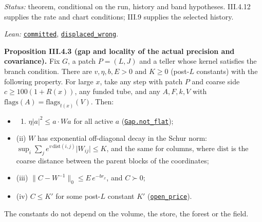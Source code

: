 \documentclass[
  letterpaper,
  11pt]{article}
\providecommand{\tightlist}{%
  \setlength{\itemsep}{0pt}\setlength{\parskip}{0pt}}
\begin{document}
\emph{Status:} theorem, conditional on the run, history and band
hypotheses. III.4.12 supplies the rate and chart conditions; III.9
supplies the selected history.

\emph{Lean:}
\href{https://github.com/yang-mills-group/OpenAI-YM-20261028/blob/3456e5e75cf8d4cd558955a5c7638fba2d68f464/YM/SectorNext/GAUSSIAN_SECTOR_CHANGE/Handoff.lean\#L132-L182}{\texttt{committed}},
\href{https://github.com/yang-mills-group/OpenAI-YM-20261028/blob/3456e5e75cf8d4cd558955a5c7638fba2d68f464/YM/SectorNext/GAUSSIAN_SECTOR_CHANGE/Stamped.lean\#L124-L137}{\texttt{displaced\_wrong}}.

\textbf{Proposition III.4.3 (gap and locality of the actual precision
and covariance).} Fix \(G\), a patch \(P=(L,J)\) and a teller whose
kernel satisfies the branch condition. There are \(v,\eta,b,E>0\) and
\(K\ge0\) (post-\(L\) constants) with the following property. For large
\(x\), take any step with patch \(P\) and coarse side
\(c\ge100(1+R(x))\), any funded tube, and any \(A,F,k,V\) with
\(\mathrm{flags}(A)=\mathrm{flags}_{t(x)}(V)\). Then:

\begin{itemize}
\tightlist
\item
  \begin{enumerate}
  \def\labelenumi{(\roman{enumi})}
  \tightlist
  \item
    \(\eta\lvert a\rvert^2\le a\cdot Wa\) for all active \(a\)
    (\href{https://github.com/yang-mills-group/OpenAI-YM-20261028/blob/3456e5e75cf8d4cd558955a5c7638fba2d68f464/YM/SectorNext/GAUSSIAN_SECTOR_CHANGE/Gap.lean\#L242-L264}{\texttt{Gap.not\_flat}});
  \end{enumerate}
\item
  (ii) \(W\) has exponential off-diagonal decay in the Schur norm:
  \(\sup_i\sum_j e^{v\,\mathrm{dist}(i,j)}\lvert W_{ij}\rvert\le K\),
  and the same for columns, where \(\mathrm{dist}\) is the coarse
  distance between the parent blocks of the coordinates;
\item
  (iii) \(\lVert C-W^{-1}\rVert_0\le E\,e^{-br_x}\), and \(C\succ0\);
\item
  (iv) \(C\le K'\) for some post-\(L\) constant \(K'\)
  (\href{https://github.com/yang-mills-group/OpenAI-YM-20261028/blob/3456e5e75cf8d4cd558955a5c7638fba2d68f464/YM/AnalyticBridge/SHARP_NORMALIZED_TAIL/Apertures.lean\#L43-L55}{\texttt{open\_price}}).
\end{itemize}

The constants do not depend on the volume, the store, the forest or the
field.
\end{document}
